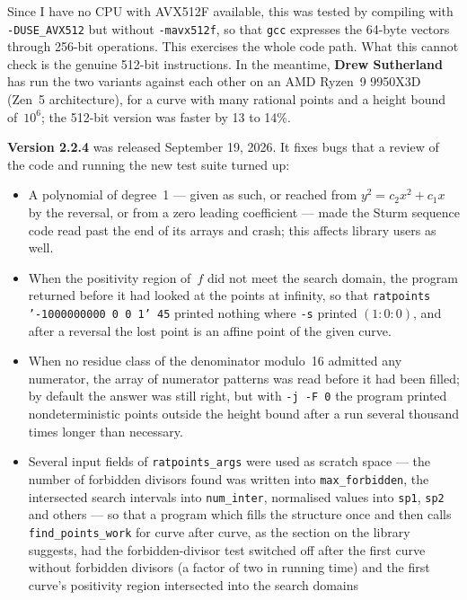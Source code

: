 \documentclass[12pt,a4paper,oneside]{amsart}
\begin{document}
Since I have no CPU with AVX512F available, this was tested by compiling
with \verb+-DUSE_AVX512+ but without \verb+-mavx512f+, so that
\texttt{gcc} expresses the 64-byte vectors through 256-bit operations.
This exercises the whole code path. What this cannot check is the
genuine 512-bit instructions. In the meantime, \textbf{Drew Sutherland} has
run the two variants against each other on an AMD Ryzen~9 9950X3D (Zen~5
architecture), for a curve with many rational points and a height bound
of~$10^6$; the 512-bit version was faster by 13 to 14\%.

\textbf{Version 2.2.4} was released September 19, 2026. It fixes bugs that a
review of the code and running the new test suite turned up:
\begin{itemize}
  \item A polynomial of degree~1 --- given as such,
        or reached from $y^2 = c_2x^2 + c_1x$ by the reversal, or from a zero
        leading coefficient --- made the Sturm sequence code read past the end of
        its arrays and crash; this affects library users as well.
  \item When the positivity region of~$f$ did not meet the search domain, the program
        returned before it had looked at the points at infinity, so that
        \texttt{ratpoints '-1000000000 0 0 1' 45} printed nothing where \verb+-s+
        printed $(1:0:0)$, and after a reversal the lost point is an affine point
        of the given curve.
  \item When no residue class of the denominator modulo~16
        admitted any numerator, the array of numerator patterns was read before it
        had been filled; by default the answer was still right, but with
        \verb+-j -F 0+ the program printed nondeterministic points outside the
        height bound after a run several thousand times longer than necessary.
  \item Several input fields of \texttt{ratpoints\_args} were used as scratch
        space --- the number of forbidden divisors found was written into
        \texttt{max\_forbidden}, the intersected search intervals into
        \texttt{num\_inter}, normalised values into \texttt{sp1}, \texttt{sp2}
        and others --- so that a program which fills the structure once and then
        calls \texttt{find\_points\_work} for curve after curve, as the section on
        the library suggests, had the forbidden-divisor test switched off after the
        first curve without forbidden divisors (a factor of two in running time)
        and the first curve's positivity region intersected into the search domains

\end{itemize}
\end{document}
